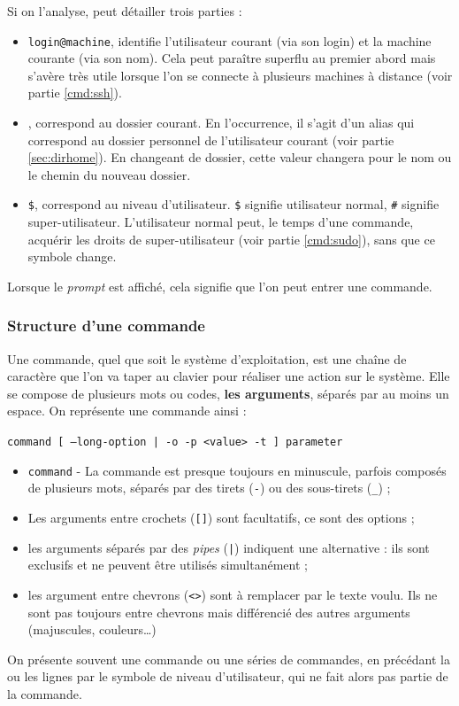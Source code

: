 Si on l'analyse, peut détailler trois parties :
\begin{itemize}
    \item \texttt{login@machine}, identifie l'utilisateur courant (via son login) et la machine courante (via son nom). Cela peut paraître superflu au premier abord mais s'avère très utile lorsque l'on se connecte à plusieurs machines à distance (voir partie \ref{cmd:ssh}).
    \item \texttt{\tilde}, correspond au dossier courant. En l'occurrence, il s'agit d'un alias qui correspond au dossier personnel de l'utilisateur courant (voir partie \ref{sec:dirhome}). En changeant de dossier, cette valeur changera pour le nom ou le chemin du nouveau dossier.
    \item \texttt{\$}, correspond au niveau d'utilisateur. \texttt{\$} signifie utilisateur normal, \texttt{\#} signifie super-utilisateur. L'utilisateur normal peut, le temps d'une commande, acquérir les droits de super-utilisateur (voir partie \ref{cmd:sudo}), sans que ce symbole change.
\end{itemize}\vspace{1mm}

Lorsque le \textit{prompt} est affiché, cela signifie que l'on peut entrer une commande.

\subsubsection{Structure d'une commande} \label{sec:command}

Une commande, quel que soit le système d'exploitation, est une chaîne de caractère que l'on va taper au clavier pour réaliser une action sur le système. Elle se compose de plusieurs mots ou codes, \textbf{les arguments}, séparés par au moins un espace. On représente une commande ainsi :
\begin{nscenter}
    \texttt{command [ --long-option | -o -p <value> -t ] parameter}
\end{nscenter}
\begin{itemize}
    \item \texttt{command} - La commande est presque toujours en minuscule, parfois composés de plusieurs mots, séparés par des tirets (\texttt{-}) ou des sous-tirets (\texttt{\_}) ;
    \item Les arguments entre crochets (\texttt{[]}) sont facultatifs, ce sont des options ;
    \item les arguments séparés par des \textit{pipes} (\texttt{|}) indiquent une alternative : ils sont exclusifs et ne peuvent être utilisés simultanément ;
    \item les argument entre chevrons (\texttt{<>}) sont à remplacer par le texte voulu. Ils ne sont pas toujours entre chevrons mais différencié des autres arguments (majuscules, couleurs\dots)
\end{itemize}
 On présente souvent une commande ou une séries de commandes, en précédant la ou les lignes par le symbole de niveau d'utilisateur, qui ne fait alors pas partie de la commande.

